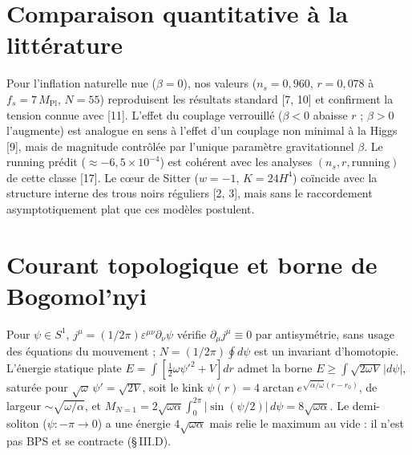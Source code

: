 \documentclass[11pt,a4paper]{article}
\newcommand{\Mpl}{M_{\mathrm{Pl}}}
\theoremstyle{plain}
\theoremstyle{remark}
\begin{document}
\section{Comparaison quantitative \`a la litt\'erature}
Pour l'inflation naturelle nue ($\beta=0$), nos valeurs ($n_s=0{,}960$, $r=0{,}078$ \`a
$f_s=7\,\Mpl$, $N=55$) reproduisent les r\'esultats standard [7, 10] et confirment la
tension connue avec [11]. L'effet du couplage verrouill\'e ($\beta<0$ abaisse $r$ ;
$\beta>0$ l'augmente) est analogue en sens \`a l'effet d'un couplage non minimal \`a la
Higgs [9], mais de magnitude contr\^ol\'ee par l'unique param\`etre gravitationnel $\beta$. Le
running pr\'edit ($\approx-6{,}5\times10^{-4}$) est coh\'erent avec les analyses
$(n_s,r,\text{running})$ de cette classe [17]. Le c\oe ur de Sitter ($w=-1$, $K=24H^4$)
co\"incide avec la structure interne des trous noirs r\'eguliers [2, 3], mais sans le
raccordement asymptotiquement plat que ces mod\`eles postulent.

\section{Courant topologique et borne de Bogomol'nyi}
Pour $\psi\in S^1$, $j^\mu=(1/2\pi)\varepsilon^{\mu\nu}\partial_\nu\psi$ v\'erifie
$\partial_\mu j^\mu\equiv0$ par antisym\'etrie, sans usage des \'equations du mouvement ;
$N=(1/2\pi)\oint d\psi$ est un invariant d'homotopie. L'\'energie statique plate
$E=\int[\tfrac12\omega\psi'^2+V]dr$ admet la borne $E\ge\int\sqrt{2\omega V}\,|d\psi|$,
satur\'ee pour $\sqrt\omega\,\psi'=\sqrt{2V}$, soit le kink
$\psi(r)=4\arctan e^{\sqrt{\alpha/\omega}(r-r_0)}$, de largeur $\sim\sqrt{\omega/\alpha}$,
et $M_{N=1}=2\sqrt{\omega\alpha}\int_0^{2\pi}|\sin(\psi/2)|\,d\psi=8\sqrt{\omega\alpha}$. Le
demi-soliton ($\psi:-\pi\to0$) a une \'energie $4\sqrt{\omega\alpha}$ mais relie le maximum
au vide : il n'est pas BPS et se contracte (\S\,III.D).

\end{document}
